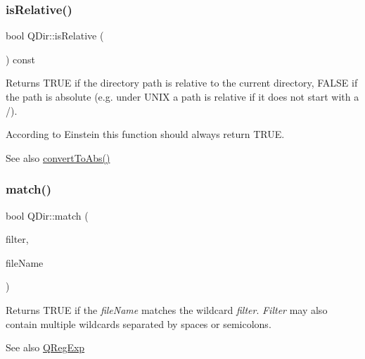 \subsubsection{\texorpdfstring{isRelative()}{isRelative()}}
{\footnotesize\ttfamily bool Q\+Dir\+::is\+Relative (\begin{DoxyParamCaption}{ }\end{DoxyParamCaption}) const\hspace{0.3cm}{\ttfamily [virtual]}}

Returns T\+R\+UE if the directory path is relative to the current directory, F\+A\+L\+SE if the path is absolute (e.\+g. under U\+N\+IX a path is relative if it does not start with a \textquotesingle{}/\textquotesingle{}).

According to Einstein this function should always return T\+R\+UE.

\begin{DoxySeeAlso}{See also}
\mbox{\hyperlink{class_q_dir_a0c05c8978b3b4158233f809e4d30c55d}{convert\+To\+Abs()}} 
\end{DoxySeeAlso}
\mbox{\label{class_q_dir_a72a73a1e4d9bf42ec4307a70605b77b9}} 
\subsubsection{\texorpdfstring{match()}{match()}\hspace{0.1cm}{\footnotesize\ttfamily [1/2]}}
{\footnotesize\ttfamily bool Q\+Dir\+::match (\begin{DoxyParamCaption}\item[{const \mbox{\hyperlink{class_q_string}{Q\+String}} \&}]{filter,  }\item[{const \mbox{\hyperlink{class_q_string}{Q\+String}} \&}]{file\+Name }\end{DoxyParamCaption})\hspace{0.3cm}{\ttfamily [static]}}

Returns T\+R\+UE if the {\itshape file\+Name} matches the wildcard {\itshape filter}. {\itshape Filter} may also contain multiple wildcards separated by spaces or semicolons. \begin{DoxySeeAlso}{See also}
\mbox{\hyperlink{class_q_reg_exp}{Q\+Reg\+Exp}} 
\end{DoxySeeAlso}
\mbox{\label{class_q_dir_aa78de265f6e5e198a90b4d0252a42df3}} 
